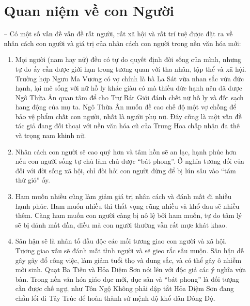 \section{Quan niệm về con Người} %
\label{sec:59_60_con_nguoi}

-- Có một số vấn đề vấn đề rất người, rất xã hội và rất trí tuệ được đặt ra về nhân cách con người và giá trị của nhân cách con người trong nền văn hóa mới:

\begin{enumerate}[label=\itshape\alph*\upshape/]

    \item Mọi người (nam hay nữ) đều có tự do quyết định đời sống của mình, nhưng tự do ấy cần được giới hạn trong tương quan với tha nhân, tập thể và xã hội. Trường hợp Ngưu Ma Vương có vợ chính là bà La Sát vừa nhan sắc vừa đức hạnh, lại mê sống với nữ hồ ly khác giàu có mà thiếu đức hạnh nên đã được Ngô Thừa Ân quan tâm để cho Trư Bát Giới đánh chết nữ hồ ly và đốt sạch hang động của mụ ta. Ngô Thừa Ân muốn đề cao chế độ một vợ chồng để bảo vệ phẩm chất con người, nhất là người phụ nữ. Đây cũng là một vấn đề tác giả đang đối thoại với nền văn hóa cũ của Trung Hoa chấp nhận đa thê và trọng nam khinh nữ.

    \item Nhân cách con người sẽ cao quý hơn và tâm hồn sẽ an lạc, hạnh phúc hơn nếu con người sống tự chủ làm chủ được ``bát phong''. Ở nghĩa tương đối của đối với đời sống xã hội, chỉ đòi hỏi con người đừng để bị lún sâu vào ``tám thứ gió'' ấy.

    \item Ham muốn nhiều cũng làm giảm giá trị nhân cách và đánh mất đi nhiều hạnh phúc. Ham muốn nhiều thì thất vọng cũng nhiều và khổ đau sẽ nhiều thêm. Càng ham muốn con người càng bị nô lệ bởi ham muốn, tự do tâm lý sẽ bị đánh mất dần, điều mà con người thường vẫn rất mực khát khao.

    \item Sân hận sẽ là nhân tố đầu độc các mối tương giao con người và xã hội. Tương giao xấu sẽ đánh mất tình người và sẽ gieo rắc sầu muộn. Sân hận dễ gây gãy đổ công việc, làm giảm tuổi thọ và dung sắc, và có thể gây ô nhiễm môi sinh. Quạt Ba Tiêu và Hỏa Diệm Sơn nói lên với độc giả các ý nghĩa vừa bàn. Trong nền văn hóa giáo dục mới, dục sân và ``bát phong'' là đối tượng cần được chế ngự, như Tôn Ngộ Không phải dập tắt Hỏa Diệm Sơn đang chắn lối đi Tây Trúc để hoàn thành sứ mệnh độ khổ dân Đông Độ.
\end{enumerate}

